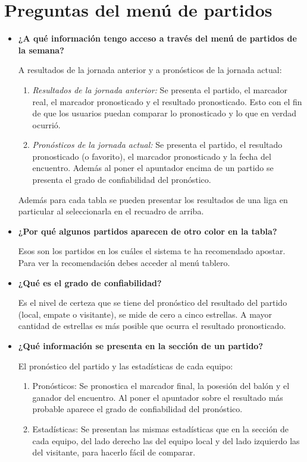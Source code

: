 \section{Preguntas del menú de partidos}
\begin{itemize}

\item \textbf{¿A qué información tengo acceso a través del menú de partidos de la semana?}


A resultados de la jornada anterior y a pronósticos de la jornada actual:
\begin{enumerate}

	\item \emph{Resultados de la jornada anterior:} Se presenta el partido, el marcador real, el marcador pronosticado y el resultado pronosticado. Esto con el fin de que los usuarios puedan comparar lo pronosticado y lo que en verdad ocurrió.
	\item \emph{Pronósticos de la jornada actual:} Se presenta el partido, el resultado pronosticado (o favorito), el marcador pronosticado y la fecha del encuentro. Además al poner el apuntador encima de un partido se presenta el grado de confiabilidad del pronóstico.
\end{enumerate}

Además para cada tabla se pueden presentar los resultados de una liga en particular al seleccionarla en el recuadro de arriba.

\item \textbf{¿Por qué algunos partidos aparecen de otro color en la tabla?}


Esos son los partidos en los cuáles el sistema te ha recomendado apostar. Para ver la recomendación debes acceder al menú tablero.

\item \textbf{¿Qué es el grado de confiabilidad?}


Es el nivel de certeza que se tiene del pronóstico del resultado del partido (local, empate o visitante), se mide de cero a cinco estrellas. A mayor cantidad de estrellas es más posible que ocurra el resultado pronosticado.

\item \textbf{¿Qué información se presenta en la sección de un partido?}


El pronóstico del partido y las estadísticas de cada equipo:
\begin{enumerate}

\item Pronósticos: Se pronostica el marcador final, la posesión del balón y el ganador del encuentro. Al poner el apuntador sobre el resultado más probable aparece el grado de confiabilidad del pronóstico.
\item Estadísticas: Se presentan las mismas estadísticas que en la sección de cada equipo, del lado derecho las del equipo local y del lado izquierdo las del visitante, para hacerlo fácil de comparar.
\end{enumerate}

\end{itemize}

